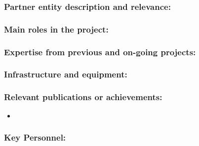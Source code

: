 
\subsubsection*{Partner entity description and relevance:}

\lipsum[1]


\subsubsection*{Main roles in the project:}

\lipsum[1]


\subsubsection*{Expertise from previous and on-going projects:}

\lipsum[1]


\subsubsection*{Infrastructure and equipment:}

\lipsum[1]


\subsubsection*{Relevant publications or achievements:}

\begin{itemize}
\item {}
\end{itemize}


\subsubsection*{Key Personnel:}

\lipsum[1]
